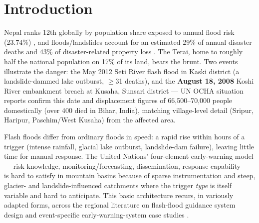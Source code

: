 \documentclass[11pt]{article}
\begin{document}
\section{Introduction}

Nepal ranks 12th globally by population share exposed to annual flood risk (23.74\%) \citep{undp2004}, and floods/landslides account for an estimated 29\% of annual disaster deaths and 43\% of disaster-related property loss \citep{dwidp2004}. The Terai, home to roughly half the national population on 17\% of its land, bears the brunt. Two events illustrate the danger: the May 2012 Seti River flash flood in Kaski district (a landslide-dammed lake outburst, $\geq$31 deaths), and the \textbf{August 18, 2008} Koshi River embankment breach at Kusaha, Sunsari district --- UN OCHA situation reports \citep{ocha2008koshi} confirm this date and displacement figures of 66,500--70,000 people domestically (over 400 died in Bihar, India), matching village-level detail (Sripur, Haripur, Paschim/West Kusaha) from the affected area.

Flash floods differ from ordinary floods in speed: a rapid rise within hours of a trigger (intense rainfall, glacial lake outburst, landslide-dam failure), leaving little time for manual response. The United Nations' four-element early-warning model --- risk knowledge, monitoring/forecasting, dissemination, response capability \citep{un2006} --- is hard to satisfy in mountain basins because of sparse instrumentation and steep, glacier- and landslide-influenced catchments where the trigger \emph{type} is itself variable and hard to anticipate. This basic architecture recurs, in variously adapted forms, across the regional literature on flash-flood guidance system design \citep{grabs2010} and event-specific early-warning-system case studies \citep{konarik,kundzewicz}.
\end{document}

